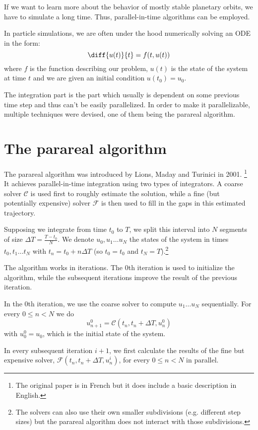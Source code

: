 \documentclass[conference]{IEEEtran}
\begin{document}
If we want to learn more about the behavior of mostly stable planetary orbits, we have to simulate a long time. Thus, parallel-in-time algorithms can be employed. \cite{parallelsolar}

In particle simulations, we are often under the hood numerically solving an ODE in the form:
$$
\diff{u(t)}{t} = f(t, u(t))
$$
where $f$ is the function describing our problem, $u(t)$ is the state of the system at time $t$ and we are given an initial condition $u(t_0) = u_0$.

The integration part is the part which usually is dependent on some previous time step and thus can't be easily parallelized. In order to make it parallelizable, multiple techniques were devised, one of them being the parareal algorithm.

\section{The parareal algorithm}

The parareal algorithm was introduced by Lions, Maday and Turinici in 2001. \cite{parareal}\footnote{The original paper is in French but it does include a basic description in English.} It achieves parallel-in-time integration using two types of integrators. A coarse solver $\mathcal{C}$ is used first to roughly estimate the solution, while a fine (but potentially expensive) solver $\mathcal{F}$ is then used to fill in the gaps in this estimated trajectory.

Supposing we integrate from time $t_0$ to $T$, we split this interval into $N$ segments of size $\Delta T = \frac{T-t_0}{N}$. We denote $u_0, u_1\dots u_N$ the states of the system in times $t_0, t_1\dots t_N$ with $t_n = t_0 + n\Delta T$ (so $t_0 = t_0$ and $t_N = T$).\footnote{The solvers can also use their own smaller subdivisions (e.g. different step sizes) but the parareal algorithm does not interact with those subdivisions.}

The algorithm works in iterations. The 0th iteration is used to initialize the algorithm, while the subsequent iterations improve the result of the previous iteration.

In the 0th iteration, we use the coarse solver to compute $u_1\dots u_N$ sequentially. For every $0 \leq n < N$ we do
$$
u^0_{n+1} = \mathcal{C}(t_n, t_n+\Delta T, u^0_n)
$$
with $u^0_0 = u_0$, which is the initial state of the system.

In every subsequent iteration $i+1$, we first calculate the results of the fine but expensive solver, $\mathcal{F}(t_n, t_n+\Delta T, u^{i}_n)$, for every $0 \leq n < N$ in parallel.
\end{document}
